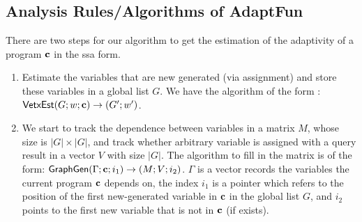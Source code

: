 \documentclass[a4paper,11pt]{article}
\newcommand{\THESYSTEM}{\textsf{AdaptFun}}
\begin{document}
\subsection{Analysis Rules/Algorithms of \THESYSTEM}

There are two steps for our algorithm to get the estimation of the adaptivity of a program $\mathbf{{c}}$ in the ssa form. 
\begin{enumerate}
    \item Estimate the variables that are new generated (via assignment) and store these variables in a global list $G$. We have the algorithm of the form : $\mathsf{VetxEst}{( G;w; \mathbf{{c}})}\to {(G';w')} $.
    \item We start to track the dependence between variables in a matrix $M$, whose size is $|G| \times |G|$, and track whether arbitrary variable is assigned with a query result in a vector $V$ with size $|G|$. The algorithm to fill in the matrix is of the form: $\mathsf{GraphGen}{(\Gamma ; \mathbf{{c}} ; i_1)}\to {(M;V;{i_2})}$. $\Gamma$ is a vector records the variables the current program $\mathbf{{c}}$ depends on, the index $i_1$ is a pointer which refers to the position of the first new-generated variable in $\mathbf{{c}}$ in the global list $G$, and $i_2$ points to the first new variable that is not in $\mathbf{{c}}$ (if exists). 
\end{enumerate}

\end{document}
